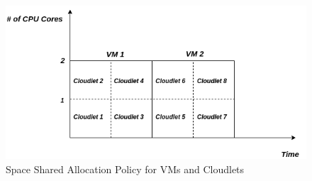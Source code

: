 \documentclass[12pt]{article}
\begin{document}
\begin{figure}[ht!]
\centering
\includegraphics[scale=0.4]{space_vm_space_cloudlet.png}
\caption{Space Shared Allocation Policy for VMs and Cloudlets}
\end{figure}




\newpage


\end{document}

